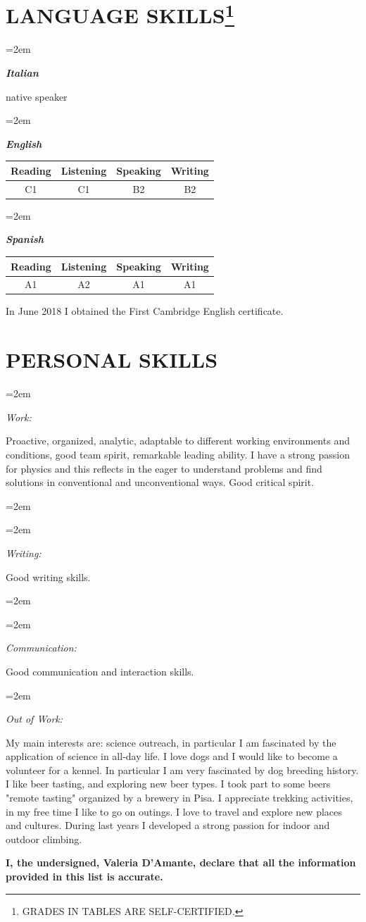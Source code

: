 \documentclass[fontsize=12pt]{article} %
\newlength{\spacebox}
\newcommand{\sepspace}{\vspace*{1em}}		%
\newcommand{\NewPart}[1]{\section*{\uppercase{#1}}}
\newcommand{\PersonalEntry}[2]{
	\noindent\hangindent=2em\hangafter=0 %
	\vspace{0.7em}
	\parbox{\spacebox}{        %
		\footnotesize{\textit{#1}}}		       %
	\hspace{1.3em} #2 \par}    %
\newcommand{\SkillsEntry}[2]{      %
	\noindent\hangindent=2em\hangafter=0 %
	\parbox{\spacebox}{        %
		\textit{#1}}			   %
	\hspace{1.5em} #2 \par}    %
\begin{document}
 	\NewPart{Language Skills\footnote{G\lowercase{rades in tables are self-certified.}}}
	\SkillsEntry{\textbf{Italian}}{native speaker}\vspace{3mm}
	\sepspace
	\SkillsEntry{\textbf{English}}{
	\begin{table}[h]
		\vspace{-8mm}\qquad \qquad \qquad \qquad \qquad
		\begin{tabular}{cccc}
			 Reading & Listening & Speaking & Writing  \\
			\midrule
			  C1 & C1 & B2 & B2 \\
			\bottomrule
		\end{tabular}
	\end{table} }
	\sepspace
	\SkillsEntry{\textbf{Spanish}}{

	\begin{table}[h]
		\vspace{-8.05mm}\qquad \qquad \qquad \qquad \qquad
		\begin{tabular}{cccc}

			Reading & Listening & Speaking & Writing  \\
			\midrule
			A1 & A2 & A1 & A1 \\
			\bottomrule
		\end{tabular}
	\end{table}}
	In June 2018 I obtained the First Cambridge English certificate.\; \cite{certificato_inglese}
	\sepspace
	\NewPart{Personal Skills}{}
	\SkillsEntry{Work:}{\hspace{-1.9cm} Proactive, organized, analytic, adaptable to different working environments and conditions, good team spirit, remarkable leading ability. I have a strong passion for physics and this reflects in the eager to understand problems and find solutions in conventional and unconventional ways. Good critical spirit.}
	\SkillsEntry{}{}
	\SkillsEntry{Writing:}{\hspace{-1.55cm} Good writing skills.}
	\SkillsEntry{}{}
	\SkillsEntry{Communication: }{\hspace{-.38cm} Good communication and interaction skills.\\}
	\SkillsEntry{Out of Work: }{\hspace{-.8cm} My main interests are: science outreach, in particular I am fascinated by the application of science in all-day life. I love dogs and I would like to become a volunteer for a kennel. In particular I am very fascinated by dog breeding history. I like beer tasting, and exploring new beer types. I took part to some beers "remote tasting" organized by a brewery in Pisa. I appreciate trekking activities, in my free time I like to go on outings. I love to travel and explore new places and cultures. During last years I developed a strong passion for indoor and outdoor climbing.}
	\vspace{5mm}
\textbf{I, the undersigned, Valeria D'Amante, declare that all the information provided in this list is accurate.}
\end{document}
